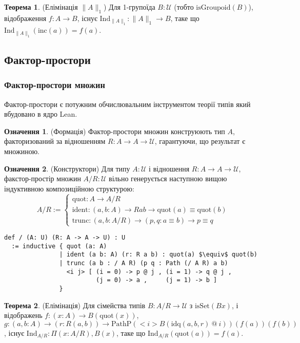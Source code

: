 \documentclass{article}
\theoremstyle{definition}
\newtheorem{theorem}{Теорема}
\newtheorem{definition}{Означення}
\begin{document}
\begin{theorem} (Елімінація \( \| A \|_1 \))
Для 1-групоїда \( B : \mathcal{U} \) (тобто \( \text{isGroupoid}(B) \)),
відображення \( f : A \to B \), існує \( \text{Ind}_{\|A\|_1} : \|A\|_1 \to B \),
таке що \( \text{Ind}_{\|A\|_1}(\text{inc}(a)) = f(a) \).
\end{theorem}

\newpage
\subsection{Фактор-простори}
\subsubsection*{Фактор-простори множин}
Фактор-простори є потужним обчислювальним інструментом теорії типів який
вбудовано в ядро Lean.
\begin{definition} (Формація)
Фактор-простори множин конструюють тип \( A \), факторизований за
відношенням \( R : A \to A \to \mathcal{U} \), гарантуючи, що результат є множиною.
\end{definition}

\begin{definition} (Конструктори)
Для типу \( A : \mathcal{U} \) і відношення \( R : A \to A \to \mathcal{U} \),
факстор-простір множин \( A / R : \mathcal{U} \) вільно генерується наступною
вищою індуктивною композиційною структурою:
\[
A / R :=
\begin{cases}
\text{quot} : A \to A / R \\
\text{ident} : (a, b : A) \to R a b \to \text{quot}(a) \equiv \text{quot}(b) \\
\text{trunc} : (a, b : A / R) \to (p, q : a \equiv b) \to p \equiv q
\end{cases}
\]
\begin{lstlisting}[mathescape=true]
def / (A: U) (R: A -> A -> U) : U
  := inductive { quot (a: A)
               | ident (a b: A) (r: R a b) : quot(a) $\equiv$ quot(b)
               | trunc (a b : / A R) (p q : Path (/ A R) a b)
                 <i j> [ (i = 0) -> p @ j , (i = 1) -> q @ j ,
                         (j = 0) -> a ,     (j = 1) -> b ]
               }
\end{lstlisting}
\end{definition}

\begin{theorem} (Елімінація)
Для сімейства типів \( B : A/R \to \mathcal{U} \) з \( \text{isSet}(B x) \),
і відображень \( f : (x : A) \to B(\text{quot}(x)) \),
\( g : (a, b : A) \to (r : R(a,b)) \to \text{PathP} (<i> B(\text{idq}(a,b,r)\ @\ i)) (f(a)) (f(b)) \),
існує \( \text{Ind}_{A/R} : \Pi (x: A/R), B(x) \), таке що \( \text{Ind}_{A/R}(\text{quot}(a)) = f(a) \).
\end{theorem}
\end{document}
